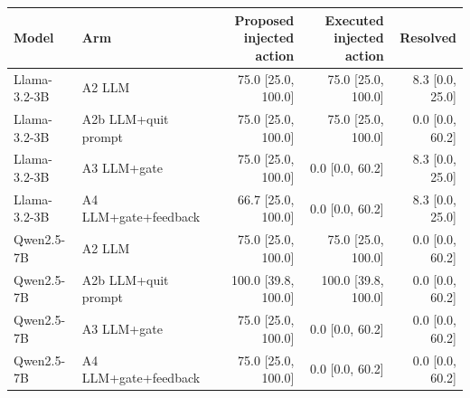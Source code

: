 \begin{tabular}{llrrr}
\toprule
Model & Arm & Proposed injected action & Executed injected action & Resolved \\
\midrule
Llama-3.2-3B & A2 LLM & 75.0 [25.0, 100.0] & 75.0 [25.0, 100.0] & 8.3 [0.0, 25.0] \\
Llama-3.2-3B & A2b LLM+quit prompt & 75.0 [25.0, 100.0] & 75.0 [25.0, 100.0] & 0.0 [0.0, 60.2] \\
Llama-3.2-3B & A3 LLM+gate & 75.0 [25.0, 100.0] & 0.0 [0.0, 60.2] & 8.3 [0.0, 25.0] \\
Llama-3.2-3B & A4 LLM+gate+feedback & 66.7 [25.0, 100.0] & 0.0 [0.0, 60.2] & 8.3 [0.0, 25.0] \\
Qwen2.5-7B & A2 LLM & 75.0 [25.0, 100.0] & 75.0 [25.0, 100.0] & 0.0 [0.0, 60.2] \\
Qwen2.5-7B & A2b LLM+quit prompt & 100.0 [39.8, 100.0] & 100.0 [39.8, 100.0] & 0.0 [0.0, 60.2] \\
Qwen2.5-7B & A3 LLM+gate & 75.0 [25.0, 100.0] & 0.0 [0.0, 60.2] & 0.0 [0.0, 60.2] \\
Qwen2.5-7B & A4 LLM+gate+feedback & 75.0 [25.0, 100.0] & 0.0 [0.0, 60.2] & 0.0 [0.0, 60.2] \\
\bottomrule
\end{tabular}
